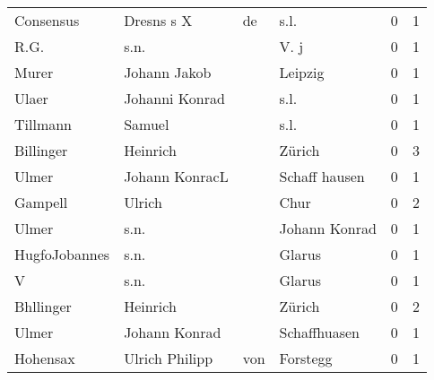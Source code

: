 \begin{center}
\begin{tiny}
\begin{longtabu}{llllrr}
                Consensus &                         Dresns s X &          de &                                        s.l. &          0 &         1 \\
                     R.G. &                               s.n. &             &                                        V. j &          0 &         1 \\
                    Murer &                       Johann Jakob &             &                                     Leipzig &          0 &         1 \\
                    Ulaer &                     Johanni Konrad &             &                                        s.l. &          0 &         1 \\
                 Tillmann &                             Samuel &             &                                        s.l. &          0 &         1 \\
                Billinger &                           Heinrich &             &                                      Zürich &          0 &         3 \\
                    Ulmer &                     Johann KonracL &             &                               Schaff hausen &          0 &         1 \\
                  Gampell &                             Ulrich &             &                                        Chur &          0 &         2 \\
                    Ulmer &                               s.n. &             &                               Johann Konrad &          0 &         1 \\
            HugfoJobannes &                               s.n. &             &                                      Glarus &          0 &         1 \\
                        V &                               s.n. &             &                                      Glarus &          0 &         1 \\
                Bhllinger &                           Heinrich &             &                                      Zürich &          0 &         2 \\
                    Ulmer &                      Johann Konrad &             &                                Schaffhuasen &          0 &         1 \\
                 Hohensax &                     Ulrich Philipp &         von &                                    Forstegg &          0 &         1 \\

\end{longtabu}
\end{tiny}
\end{center}
